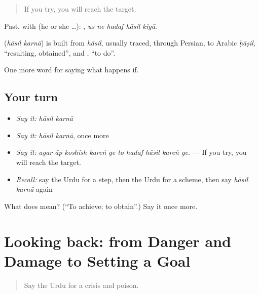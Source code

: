 \begin{quote}
If you try, you will reach the target.
\end{quote}

Past, with  (he or she …):     , \emph{us ne hadaf hāsil kiyā}.

\begin{cousinweb}
\textbf{ } (\emph{hāsil karnā}) is built from \emph{hāsil}, usually traced, through Persian, to Arabic \emph{ḥāṣil}, \textquotedblleft{}resulting, obtained\textquotedblright{}, and \textbf{}, \textquotedblleft{}to do\textquotedblright{}.
\end{cousinweb}

\begin{grammarlens}[title={What you've built}]
One more word for saying what happens if.
\end{grammarlens}

\subsection*{Your turn}
\begin{itemize}
\raggedright
  \item \emph{Say it:} \emph{hāsil karnā}
  \item \emph{Say it:} \emph{hāsil karnā}, once more
  \item \emph{Say it:} \emph{agar āp koshish kareṅ ge to hadaf hāsil kareṅ ge.} — If you try, you will reach the target.
  \item \emph{Recall:} say the Urdu for a step, then the Urdu for a scheme, then say \emph{hāsil karnā} again
\end{itemize}

\begin{tcolorbox}[breakable,colback=teal!4,colframe=teal!35!black,title={Before you move on}]
What does   mean? (\textquotedblleft{}To achieve; to obtain\textquotedblright{}.) Say it once more.
\end{tcolorbox}
\section[(dialogue)]{Looking back: from Danger and Damage to Setting a Goal}

\label{lesson:UR-R378-review-371-378}



\begin{quote}
Say the Urdu for a crisis and poison.
\end{quote}

